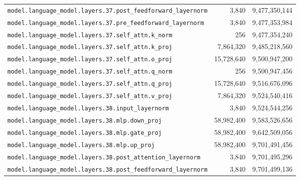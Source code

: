 \documentclass[10pt,a4paper]{article}
\theoremstyle{definition}
\begin{document}
\begin{appendices}
\begin{longtable}{p{9.5cm}rr}
\texttt{model.\allowbreak{}language\_model.\allowbreak{}layers.\allowbreak{}37.\allowbreak{}post\_feedforward\_layernorm} & 3,840 & 9,477,350,144 \\
\texttt{model.\allowbreak{}language\_model.\allowbreak{}layers.\allowbreak{}37.\allowbreak{}pre\_feedforward\_layernorm} & 3,840 & 9,477,353,984 \\
\texttt{model.\allowbreak{}language\_model.\allowbreak{}layers.\allowbreak{}37.\allowbreak{}self\_attn.\allowbreak{}k\_norm} & 256 & 9,477,354,240 \\
\texttt{model.\allowbreak{}language\_model.\allowbreak{}layers.\allowbreak{}37.\allowbreak{}self\_attn.\allowbreak{}k\_proj} & 7,864,320 & 9,485,218,560 \\
\texttt{model.\allowbreak{}language\_model.\allowbreak{}layers.\allowbreak{}37.\allowbreak{}self\_attn.\allowbreak{}o\_proj} & 15,728,640 & 9,500,947,200 \\
\texttt{model.\allowbreak{}language\_model.\allowbreak{}layers.\allowbreak{}37.\allowbreak{}self\_attn.\allowbreak{}q\_norm} & 256 & 9,500,947,456 \\
\texttt{model.\allowbreak{}language\_model.\allowbreak{}layers.\allowbreak{}37.\allowbreak{}self\_attn.\allowbreak{}q\_proj} & 15,728,640 & 9,516,676,096 \\
\texttt{model.\allowbreak{}language\_model.\allowbreak{}layers.\allowbreak{}37.\allowbreak{}self\_attn.\allowbreak{}v\_proj} & 7,864,320 & 9,524,540,416 \\
\texttt{model.\allowbreak{}language\_model.\allowbreak{}layers.\allowbreak{}38.\allowbreak{}input\_layernorm} & 3,840 & 9,524,544,256 \\
\texttt{model.\allowbreak{}language\_model.\allowbreak{}layers.\allowbreak{}38.\allowbreak{}mlp.\allowbreak{}down\_proj} & 58,982,400 & 9,583,526,656 \\
\texttt{model.\allowbreak{}language\_model.\allowbreak{}layers.\allowbreak{}38.\allowbreak{}mlp.\allowbreak{}gate\_proj} & 58,982,400 & 9,642,509,056 \\
\texttt{model.\allowbreak{}language\_model.\allowbreak{}layers.\allowbreak{}38.\allowbreak{}mlp.\allowbreak{}up\_proj} & 58,982,400 & 9,701,491,456 \\
\texttt{model.\allowbreak{}language\_model.\allowbreak{}layers.\allowbreak{}38.\allowbreak{}post\_attention\_layernorm} & 3,840 & 9,701,495,296 \\
\texttt{model.\allowbreak{}language\_model.\allowbreak{}layers.\allowbreak{}38.\allowbreak{}post\_feedforward\_layernorm} & 3,840 & 9,701,499,136 \\

\end{longtable}
\end{appendices}
\end{document}
